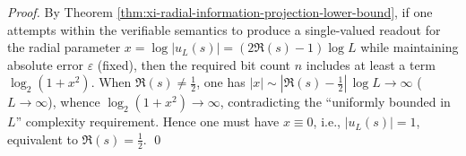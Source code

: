 \begin{proof}
By Theorem \ref{thm:xi-radial-information-projection-lower-bound},
if one attempts within the verifiable semantics to produce a single-valued readout for the radial parameter \(x=\log|u_L(s)|=(2\Re(s)-1)\log L\) while maintaining absolute error \(\varepsilon\) (fixed), then the required bit count \(n\) includes at least a term \(\log_2(1+x^2)\).
When \(\Re(s)\neq\tfrac12\), one has \(|x|\sim |\Re(s)-\tfrac12|\,\log L\to\infty\) (\(L\to\infty\)), whence \(\log_2(1+x^2)\to\infty\), contradicting the ``uniformly bounded in \(L\)'' complexity requirement.
Hence one must have \(x\equiv 0\), i.e., \(|u_L(s)|=1\), equivalent to \(\Re(s)=\tfrac12\). \qed
\end{proof}

\endinput
